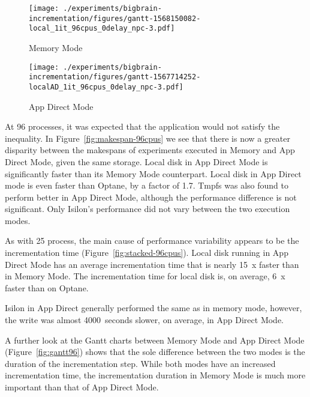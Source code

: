 \documentclass[conference]{IEEEtran}
\begin{document}
\begin{figure*}
    \begin{subfigure}{\columnwidth}
        \centering
    \texttt{[image: ./experiments/bigbrain-incrementation/figures/gantt-1568150082-local\_1it\_96cpus\_0delay\_npc-3.pdf]}
    \caption{Memory Mode}
\end{subfigure}
\begin{subfigure}{\columnwidth}
        \centering
    \texttt{[image: ./experiments/bigbrain-incrementation/figures/gantt-1567714252-localAD\_1it\_96cpus\_0delay\_npc-3.pdf]}
    \caption{App Direct Mode}
\end{subfigure}
\caption{Gantt charts for local disk processing 125 blocks of the 40$\mu$m BigBrain using 96 processes with no delay}\label{fig:gantt96}
\end{figure*}

At 96 processes, it was expected that the application would not satisfy the inequality.
In Figure~\ref{fig:makespan-96cpus} we see that there is now a greater disparity between the
makespans of experiments executed in Memory and App Direct Mode, given the same storage. Local disk
in App Direct Mode is significantly faster than its Memory Mode counterpart. Local disk in App Direct
mode is even faster than Optane, by a factor of 1.7. Tmpfs was also found to perform better in App Direct Mode, although
the performance difference is not significant. Only Isilon's performance did not vary between the
two execution modes.

As with 25 process, the main cause of performance variability appears to be the incrementation
time (Figure~\ref{fig:stacked-96cpus}). Local disk running in App Direct Mode has an average
incrementation time that is nearly 15~x faster than in Memory Mode. The incrementation time
for local disk is, on average, 6~x faster than on Optane.

Isilon in App Direct generally performed the same as in memory mode, however, the write
was almost 4000~seconds slower, on average, in App Direct Mode.

A further look at the Gantt charts between Memory Mode and App Direct Mode (Figure~\ref{fig:gantt96})
shows that the sole difference between the two modes is the duration of the incrementation step.
While both modes have an increased incrementation time, the incrementation duration in
Memory Mode is much more important than that of App Direct Mode.
\end{document}
